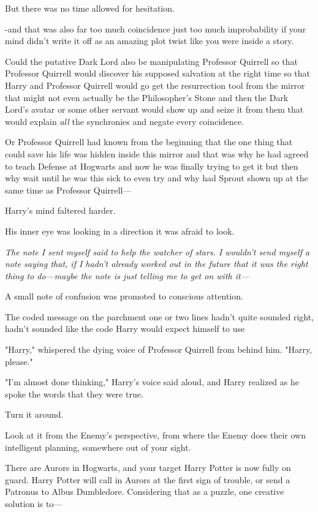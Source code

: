 But there was no time allowed for hesitation.

-and that was also far too much coincidence just too much improbability if your
mind didn't write it off as an amazing plot twist like you were inside a story.

Could the putative Dark Lord also be manipulating Professor Quirrell so that
Professor Quirrell would discover his supposed salvation at the right time so
that Harry and Professor Quirrell would go get the resurrection tool from the
mirror that might not even actually be the Philosopher's Stone and then the
Dark Lord's avatar or some other servant would show up and seize it from them
that would explain \emph{all} the synchronies and negate every coincidence.

Or Professor Quirrell had known from the beginning that the one thing that
could save his life was hidden inside this mirror and that was why he had
agreed to teach Defense at Hogwarts and now he was finally trying to get it but
then why wait until he was this sick to even try and why had Sprout shown up at
the same time as Professor Quirrell---

Harry's mind faltered harder.

His inner eye was looking in a direction it was afraid to look.

\emph{The note I sent myself said to help the watcher of stars. I wouldn't send
myself a note saying that, if I hadn't already worked out in the future that it
was the right thing to do---maybe the note is just telling me to get on with
it---}

A small note of confusion was promoted to conscious attention.

The coded message on the parchment{\el} one or two lines hadn't quite
sounded right, hadn't sounded like the code Harry would expect himself to
use{\el}

"Harry," whispered the dying voice of Professor Quirrell from behind him.
"Harry, please."

"I'm almost done thinking," Harry's voice said aloud, and Harry realized as he
spoke the words that they were true.

Turn it around.

Look at it from the Enemy's perspective, from where the Enemy does their own
intelligent planning, somewhere out of your sight.

There are Aurors in Hogwarts, and your target Harry Potter is now fully on
guard. Harry Potter will call in Aurors at the first sign of trouble, or send a
Patronus to Albus Dumbledore. Considering that as a puzzle, one creative
solution is to---

